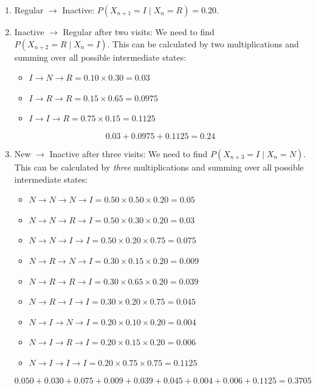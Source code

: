 \begin{Answer}[ref={ex:markov_2}]


    \begin{enumerate}
        \item Regular $\rightarrow$ Inactive: $P(X_{n+1}=I \mid X_n=R) = 0.20$.
        \item Inactive $\rightarrow$ Regular after two visits: We need to find $P(X_{n+2}=R \mid X_n=I)$. This can be calculated by two multiplications and summing over all possible intermediate states:
              \begin{itemize}
                  \item $I\to N\to R = 0.10 \times 0.30 = 0.03$
                  \item $I\to R\to R = 0.15 \times 0.65 = 0.0975$
                  \item $I\to I\to R = 0.75 \times 0.15 = 0.1125$
              \end{itemize}

              $$0.03+0.0975+0.1125 = 0.24$$
        \item New $\rightarrow$ Inactive after three visits: We need to find $P(X_{n+3}=I \mid X_n=N)$. This can be calculated by \emph{three} multiplications and summing over all possible intermediate states:
              \begin{itemize}
                  \item $N\to N\to N\to I = 0.50 \times 0.50 \times 0.20 = 0.05$
                  \item $N\to N\to R\to I = 0.50 \times 0.30 \times 0.20 = 0.03$
                  \item $N\to N\to I\to I = 0.50 \times 0.20 \times 0.75 = 0.075$
                  \item $N\to R\to N\to I = 0.30 \times 0.15 \times 0.20 = 0.009$
                  \item $N\to R\to R\to I = 0.30 \times 0.65 \times 0.20 = 0.039$
                  \item $N\to R\to I\to I = 0.30 \times 0.20 \times 0.75 = 0.045$
                  \item $N\to I\to N\to I = 0.20 \times 0.10 \times 0.20 = 0.004$
                  \item $N\to I\to R\to I = 0.20 \times 0.15 \times 0.20 = 0.006$
                  \item $N\to I\to I\to I = 0.20 \times 0.75 \times 0.75 = 0.1125$
              \end{itemize}

              $$0.050+0.030+0.075+0.009+0.039+0.045+0.004+0.006+0.1125 = 0.3705$$
    \end{enumerate}
\end{Answer}

